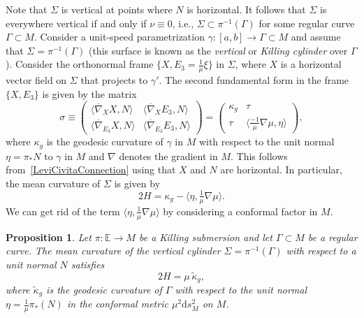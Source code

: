\documentclass[a4paper,10pt,reqno]{amsart}
\newcommand{\df}{\mathrm{d}}
\newcommand{\E}{\mathbb{E}}
\newtheorem{proposition}[theorem]{Proposition}
\theoremstyle{definition}
\theoremstyle{remark}
\numberwithin{equation}{section}
\begin{document}
Note that $\Sigma$ is vertical at points where $N$ is horizontal. It follows that $\Sigma$ is everywhere vertical if and only if $\nu\equiv 0$, i.e., $\Sigma\subset\pi^{-1}(\Gamma)$ for some regular curve $\Gamma\subset M$. Consider a unit-speed parametrization $\gamma\colon[a,b]\to\Gamma\subset M$ and assume that $\Sigma=\pi^{-1}(\Gamma)$ (this surface is known as the \emph{vertical} or \emph{Killing cylinder} over $\Gamma$). Consider the orthonormal frame $\{X,E_3=\frac{1}{\mu}\xi\}$ in $\Sigma$, where $X$ is a horizontal vector field on $\Sigma$ that projects to $\gamma'$. The second fundamental form in the frame $\{X,E_3\}$ is given by the matrix
\[\sigma\equiv\begin{pmatrix}
	\langle\overline\nabla_X X,N\rangle&\langle \overline\nabla_X E_3,N\rangle\\\langle \overline\nabla_{E_3} X,N\rangle&\langle \overline\nabla_{E_3} E_3,N\rangle
\end{pmatrix}=\begin{pmatrix}
\kappa_g&\tau\\\tau&\langle\tfrac{-1}{\mu}\nabla\mu,\eta\rangle
\end{pmatrix},\]
where $\kappa_g$ is the geodesic curvature of $\gamma$ in $M$ with respect to the unit normal $\eta=\pi_*N$ to $\gamma$ in $M$ and $\nabla$ denotes the gradient in $M$. This follows from~\eqref{LeviCivitaConnection} using that $X$ and $N$ are horizontal. In particular, the mean curvature of $\Sigma$ is given by
\begin{equation}\label{eqn:H-vertical-cylinder}
	2H=\kappa_g-\langle\eta,\tfrac{1}{\mu}\nabla\mu\rangle.
\end{equation}
We can get rid of the term $\langle\eta,\tfrac{1}{\mu}\nabla\mu\rangle$ by considering a conformal factor in $M$.
			
\begin{proposition}\label{prop:H-invariant}
Let $\pi:\E\to M$ be a Killing submersion and let $\Gamma\subset M$ be a regular curve. The mean curvature of the vertical cylinder $\Sigma=\pi^{-1}(\Gamma)$ with respect to a unit normal $N$ satisfies 
\[2H=\mu\,\widetilde\kappa_g,\]
where $\widetilde\kappa_g$ is the geodesic curvature of $\Gamma$ with respect to the unit normal $\eta=\frac{1}{\mu}\pi_*(N)$ in the conformal metric $\mu^2\df s^2_M$ on $M$.
\end{proposition}
					
\end{document}
